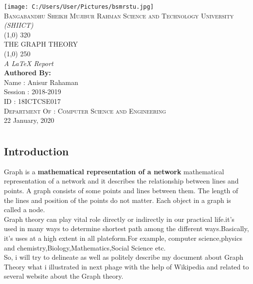 \documentclass[12pt,letterpaper]{report}
\begin{document}
\begin{titlepage}
\begin{center}

\texttt{[image: C:/Users/User/Pictures/bsmrstu.jpg]}\\
[0.4cm]
\textsc{\huge Bangabandhu Sheikh Mujibur Rahman Science and}
\textsc{\huge  Technology University }
\linebreak
\textit{\large { \color{purple} (SHIICT)}} \\
\line (1,0) {320}\\
[0.6cm]

\textsc{\huge {\color{blue}T}{\color{magenta}HE GRAPH THEORY}}\\
[0.3cm]
\line (1,0) {250}\\
[0.1cm]
\textit{\large A{ \color{red} \LaTeX}  Report}\\
[1.3cm]
\textbf{\huge \color{teal}  Authored By:}\\
[0.7cm]
{\huge Name : Anisur Rahaman}\\
{\Large Session : 2018-2019}\\
\Large ID : 18ICTCSE017\\
\textsc{\Large Department Of : Computer Science and Engineering}\\
[1cm]
\color{blue}
22 January, 2020\\
\end{center}
\end{titlepage}
\newpage
{\color{teal}\tableofcontents
{}}

\begin{center}

\end{center}
 \chapter{}
\section{Introduction}\label{sec:intro}

 Graph is a {\textbf{mathematical representation of a network} mathematical representation of a network} and it describes the relationship between lines and points. A graph consists of some points and lines between them. The length of the lines and position of the points do not matter. Each object in a graph is called a node.\\
[0.8cm]
Graph theory can play vital role directly or indirectly in our practical life.it's used in many ways to determine shortest path among the different ways.Basically, it's uses at a high extent in all plateform.For example, 
computer science,physics and chemistry,Biology,Mathematics,Social Science etc. \\
[0.8cm]
So, i will try to delineate as well as politely describe my document about Graph Theory what i illustrated in next phage with the help of Wikipedia and related to several website about the Graph  theory.
 
\end{document}
